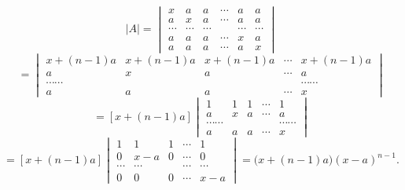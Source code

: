 \begin{example}[求和法]
\[
|A|=\begin{vmatrix}
x&a&a&\cdots&a&a\\
a&x&a&\cdots&a&a\\
\cdots&\cdots&\cdots& &\cdots&\cdots\\
a&a&a&\cdots&x&a\\
a&a&a&\cdots&a&x
\end{vmatrix}
\]
\[
=\begin{vmatrix}
x+(n-1)a&x+(n-1)a&x+(n-1)a&\cdots&x+(n-1)a\\
a&x&a&\cdots&a\\
\cdots\cdots& & & &\cdots\cdots\\
a&a&a&\cdots&x
\end{vmatrix}
\]
\[
=[x+(n-1)a]\begin{vmatrix}
1&1&1&\cdots&1\\
a&x&a&\cdots&a\\
\cdots\cdots& & & &\cdots\cdots\\
a&a&a&\cdots&x
\end{vmatrix}
\]
\[
=[x+(n-1)a]\begin{vmatrix}
1&1&1&\cdots&1\\
0&x-a&0&\cdots&0\\
\cdots&\cdots& &\cdots&\cdots\\
0&0&0&\cdots&x-a
\end{vmatrix}
=\bigl(x+(n-1)a\bigr)(x-a)^{n-1}.
\]
\end{example}

